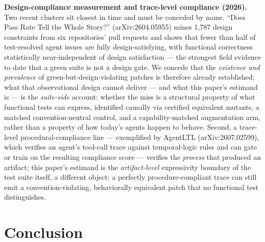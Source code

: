 \documentclass[11pt]{article}
\begin{document}
\textbf{Design-compliance measurement and trace-level compliance (2026).} Two recent clusters sit closest in time and must be conceded by name. ``Does Pass Rate Tell the Whole Story?'' (arXiv:2604.05955) mines 1{,}787 design constraints from six repositories' pull requests and shows that fewer than half of test-resolved agent issues are fully design-satisfying, with functional correctness statistically near-independent of design satisfaction --- the strongest field evidence to date that a green suite is not a design gate. We concede that the \emph{existence and prevalence} of green-but-design-violating patches is therefore already established; what that observational design cannot deliver --- and what this paper's estimand is --- is the \emph{suite-side} account: whether the miss is a structural property of what functional tests can express, identified causally via certified equivalent mutants, a matched convention-neutral control, and a capability-matched augmentation arm, rather than a property of how today's agents happen to behave. Second, a trace-level procedural-compliance line --- exemplified by AgentLTL (arXiv:2607.02599), which verifies an agent's tool-call trace against temporal-logic rules and can gate or train on the resulting compliance score --- verifies the \emph{process} that produced an artifact; this paper's estimand is the \emph{artifact-level} expressivity boundary of the test suite itself, a different object: a perfectly procedure-compliant trace can still emit a convention-violating, behaviorally equivalent patch that no functional test distinguishes.

\section{Conclusion}
\end{document}
